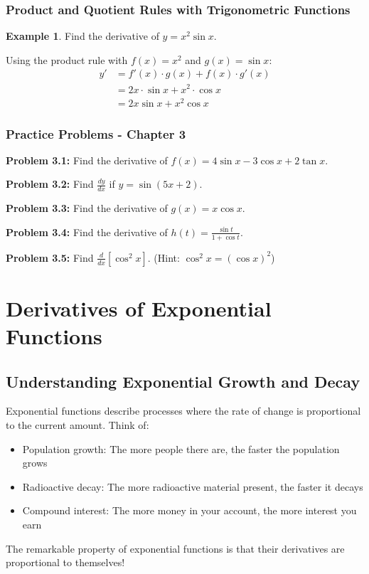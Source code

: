 \documentclass[12pt,a4paper]{book}
\theoremstyle{definition}
\newtheorem{example}{Example}[chapter]
\begin{document}
\subsection{Product and Quotient Rules with Trigonometric Functions}

\begin{example}
Find the derivative of $y = x^2 \sin x$.

Using the product rule with $f(x) = x^2$ and $g(x) = \sin x$:
\begin{align}
y' &= f'(x) \cdot g(x) + f(x) \cdot g'(x)\\
&= 2x \cdot \sin x + x^2 \cdot \cos x\\
&= 2x\sin x + x^2\cos x
\end{align}
\end{example}

\subsection{Practice Problems - Chapter 3}

\textbf{Problem 3.1:} Find the derivative of $f(x) = 4\sin x - 3\cos x + 2\tan x$.

\textbf{Problem 3.2:} Find $\frac{dy}{dx}$ if $y = \sin(5x + 2)$.

\textbf{Problem 3.3:} Find the derivative of $g(x) = x\cos x$.

\textbf{Problem 3.4:} Find the derivative of $h(t) = \frac{\sin t}{1 + \cos t}$.

\textbf{Problem 3.5:} Find $\frac{d}{dx}[\cos^2 x]$. (Hint: $\cos^2 x = (\cos x)^2$)

\chapter{Derivatives of Exponential Functions}

\section{Understanding Exponential Growth and Decay}

\begin{intuition}
Exponential functions describe processes where the rate of change is proportional to the current amount. Think of:
\begin{itemize}
    \item Population growth: The more people there are, the faster the population grows
    \item Radioactive decay: The more radioactive material present, the faster it decays
    \item Compound interest: The more money in your account, the more interest you earn
\end{itemize}

The remarkable property of exponential functions is that their derivatives are proportional to themselves!
\end{intuition}
\end{document}
